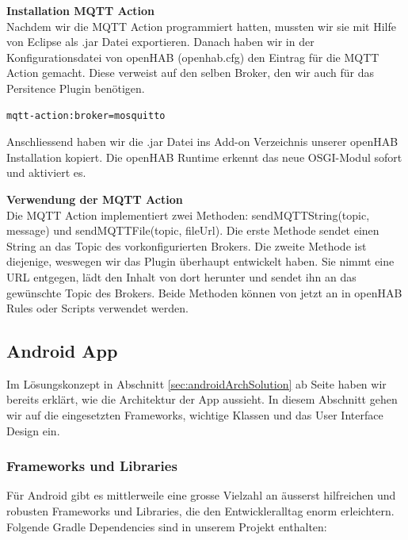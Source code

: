 \textbf{Installation MQTT Action}\\
Nachdem wir die MQTT Action programmiert hatten, mussten wir sie mit Hilfe von Eclipse als .jar Datei exportieren. Danach haben wir in der Konfigurationsdatei von openHAB (openhab.cfg) den Eintrag für die MQTT Action gemacht. Diese verweist auf den selben Broker, den wir auch für das Persitence Plugin benötigen.


\begin{lstlisting}[style=csharp, caption=openhab.cfg]
mqtt-action:broker=mosquitto
\end{lstlisting}

Anschliessend haben wir die .jar Datei ins Add-on Verzeichnis unserer openHAB Installation kopiert. Die openHAB Runtime erkennt das neue OSGI-Modul sofort und aktiviert es.

\textbf{Verwendung der MQTT Action}\\
Die MQTT Action implementiert zwei Methoden: sendMQTTString(topic, message) und sendMQTTFile(topic, fileUrl). Die erste Methode sendet einen String an das Topic des vorkonfigurierten Brokers. Die zweite Methode ist diejenige, weswegen wir das Plugin überhaupt entwickelt haben. Sie nimmt eine URL entgegen, lädt den Inhalt von dort herunter und sendet ihn an das gewünschte Topic des Brokers. Beide Methoden können von jetzt an in openHAB Rules oder Scripts verwendet werden.

\subsection{Android App}
Im Lösungskonzept in Abschnitt \ref{sec:androidArchSolution} ab Seite \pageref{sec:androidArchSolution} haben wir bereits erklärt, wie die Architektur der App aussieht. In diesem Abschnitt gehen wir auf die eingesetzten Frameworks, wichtige Klassen und das User Interface Design ein.

\subsubsection{Frameworks und Libraries}
Für Android gibt es mittlerweile eine grosse Vielzahl an äusserst hilfreichen und robusten Frameworks und Libraries, die den Entwickleralltag enorm erleichtern. Folgende Gradle Dependencies sind in unserem Projekt enthalten:

